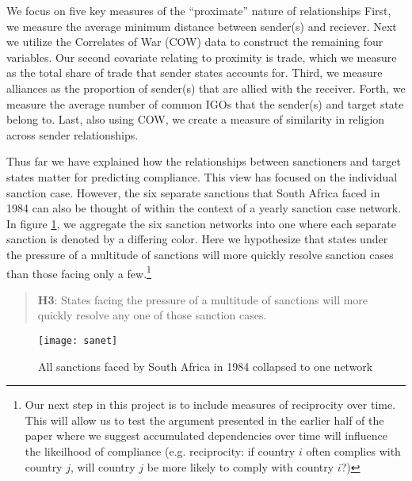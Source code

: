 We focus on five key measures of the ``proximate'' nature of relationships First, we measure the average minimum distance between sender(s) and reciever. Next we utilize the Correlates of War (COW) data to construct the remaining four variables. Our second covariate relating to proximity is trade, which we measure as the total share of trade that sender states accounts for. Third, we measure alliances as the proportion of sender(s) that are allied with the receiver. Forth, we measure the average number of common IGOs that the sender(s) and target state belong to. Last, also using COW, we create a measure of similarity in religion across sender relationships. %
  
Thus far we have explained how the relationships between sanctioners and target states matter for predicting compliance. This view has focused on the individual sanction case. However, the six separate sanctions that South Africa faced in 1984 can also be thought of within the context of a yearly sanction case network. In figure \ref{fig:sanet}, we aggregate the six sanction networks into one where each separate sanction is denoted by a differing color. Here we hypothesize that states under the pressure of a multitude of sanctions will more quickly resolve sanction cases than those facing only a few.\footnote{Our next step in this project is to include measures of reciprocity over time. This will allow us to test the argument presented in the earlier half of the paper where we suggest accumulated dependencies over time will influence the likeilhood of compliance (e.g. reciprocity: if country $i$ often complies with country $j$, will country $j$ be more likely to comply with country $i$?)}

\begin{quote}
	\textbf{H3}: States facing the pressure of a multitude of sanctions will more quickly resolve any one of those sanction cases.
\end{quote}

\begin{figure}[ht]
	\centering
	\texttt{[image: sanet]}
	\caption{All sanctions faced by South Africa in 1984 collapsed to one network}
	\label{fig:sanet}
\end{figure}
\FloatBarrier